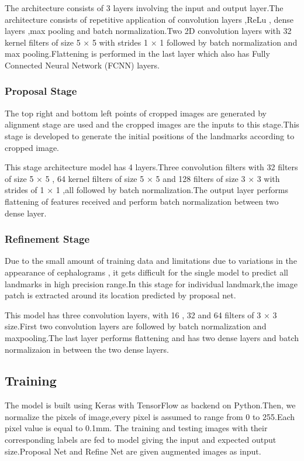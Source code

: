 \documentclass[sn-mathphys]{sn-jnl}%
\theoremstyle{thmstyleone}%
\theoremstyle{thmstyletwo}%
\theoremstyle{thmstylethree}%
\begin{document}
 \par 
 The architecture consists of 3 layers involving the input and output layer.The architecture consists of repetitive application of convolution layers ,ReLu , dense layers ,max pooling and batch normalization.Two 2D convolution layers with 32 kernel filters of size 5 × 5 with strides 1 × 1 followed by batch normalization and max pooling.Flattening is performed in the last layer which also has Fully Connected Neural Network (FCNN) layers.

 
  \subsubsection{Proposal Stage}
 The top right and bottom left points of cropped images are  generated by alignment stage are used and the cropped images are the inputs to this stage.This stage is developed to generate the initial positions of the landmarks according to cropped image.
 
 \par
  This stage architecture model has 4 layers.Three convolution filters with 32 filters of size 5 × 5 , 64 kernel filters of size 5 × 5 and 128 filters of size 3 × 3 with strides of 1 × 1 ,all followed by batch normalization.The output layer performs flattening of features received and perform batch normalization between two dense layer. 
 
 
 
 \subsubsection{Refinement Stage}
Due to  the small amount of training data and limitations  due to variations in the appearance of cephalograms , it gets difficult for the single model to predict all landmarks in high precision range.In this stage for individual landmark,the image patch is extracted around its location predicted by proposal net.
 
 \par This model has three convolution layers, with 16 , 32 and 64 filters of 3 × 3 size.First two convolution layers are followed by batch  normalization and maxpooling.The last layer performs flattening and has two dense layers and batch normalizaion in between the two dense layers.
 
 
 
 
 \subsection{Training}
The model  is built using Keras with TensorFlow as backend on Python.Then, we normalize the pixels of image,every pixel is assumed to range from 0 to 255.Each pixel value is equal to 0.1mm. The training and testing images with their corresponding labels are fed to model giving the input and expected output size.Proposal Net and Refine Net are given augmented images as input.
 
\end{document}
